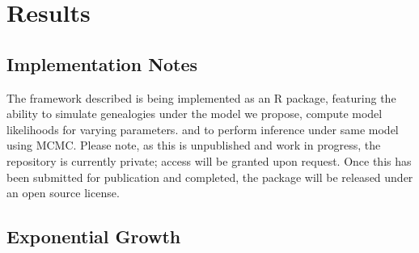 \documentclass{ieeeaccess}
\theoremstyle{definition}
\begin{document}
\section{Results}
\subsection{Implementation Notes}
The framework described is being implemented as an R package, featuring the ability to simulate genealogies under the model we propose, compute model likelihoods for varying parameters. and to perform inference under same model using MCMC. Please note, as this is unpublished and work in progress, the repository is currently private; access will be granted upon request. Once this has been submitted for publication and completed, the package will be released under an open source license.
\subsection{Exponential Growth}
\end{document}
